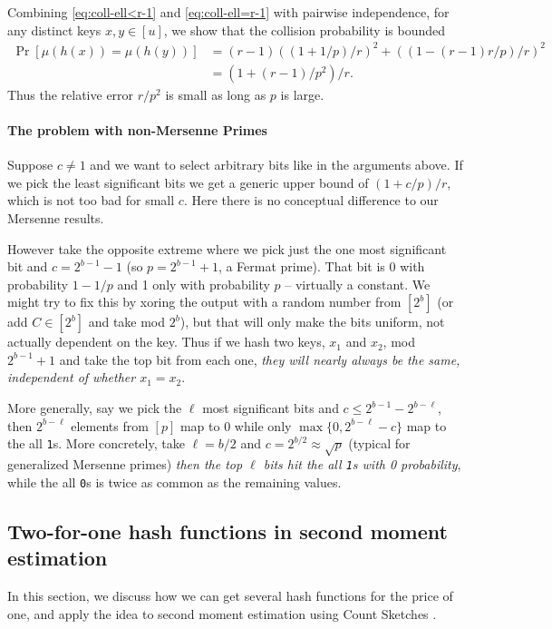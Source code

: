 Combining \eqref{eq:coll-ell<r-1} and \eqref{eq:coll-ell=r-1} with
pairwise independence, for any distinct keys $x,y\in [u]$, we show that the
collision probability is bounded
\begin{align}
	\Pr[\mu(h(x))=\mu(h(y))]
	 & =(r-1)((1+1/p)/r)^2+((1-(r-1)r/p)/r)^2 \nonumber
	\\&=(1+(r-1)/p^2)/r
	.\label{eq:coll}
\end{align}
Thus the relative error $r/p^2$ is small as long as $p$ is large.

\paragraph{The problem with non-Mersenne Primes}

Suppose $c\neq 1$ and we want to select arbitrary bits like in the arguments above.
If we pick the least significant bits we get a generic upper bound of $(1+c/p)/r$, which is not too bad for small $c$.
Here there is no conceptual difference to our Mersenne results.

However take the opposite extreme where
we pick just the one most significant bit
and $c=2^{b-1}-1$ (so $p=2^{b-1}+1$, a Fermat prime).
That bit is $0$ with probability $1-1/p$ and 1 only with probability $p$ -- virtually a constant.
We might try to fix this by xoring the output with a random number from $[2^b]$ (or add $C\in[2^b]$ and take mod $2^b$), but that will only make the bits uniform, not actually dependent on the key.
Thus if we hash two keys, $x_1$ and $x_2$, mod $2^{b-1}+1$ and take the top bit from each one, \emph{they will nearly always be the same, independent of whether $x_1=x_2$}.

More generally,
say we pick the $\ell$ most significant bits
and $c\leq 2^{b-1}-2^{b-\ell}$, then $2^{b-\ell}$ elements from
$[p]$ map to $0$ while only $\max\{0,2^{b-\ell}-c\}$
map to the all \texttt{1}s.
More concretely, take $\ell=b/2$ and $c=2^{b/2}\approx\sqrt{p}$ (typical for generalized Mersenne primes) \emph{then the top $\ell$ bits hit the all \texttt{1}s with 0 probability}, while the all \texttt{0}s is twice as common as the remaining values.


\subsection{Two-for-one hash functions in second moment estimation}
In this section, we discuss how we can get several hash functions for
the price of one, and apply the idea to second moment estimation using
Count Sketches \cite{charikar04count-sketch}.

